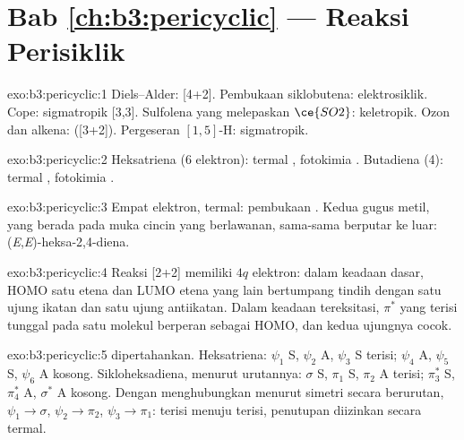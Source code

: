 \section*{Bab \ref{ch:b3:pericyclic} --- Reaksi Perisiklik}

\begin{solution}{exo:b3:pericyclic:1}
Diels--Alder:  [4+2]. Pembukaan siklobutena: elektrosiklik. Cope: sigmatropik
[3,3]. Sulfolena yang melepaskan $\ce{SO2}$: keletropik. Ozon dan alkena: 
([3+2]). Pergeseran $[1,5]$-H: sigmatropik.
\end{solution}

\begin{solution}{exo:b3:pericyclic:2}
Heksatriena (6 elektron): termal , fotokimia .
Butadiena (4): termal , fotokimia .
\end{solution}

\begin{solution}{exo:b3:pericyclic:3}
Empat elektron, termal: pembukaan . Kedua gugus metil, yang berada pada muka
cincin yang berlawanan, sama-sama berputar ke luar: (\textit{E},\textit{E})-heksa-2,4-diena.
\end{solution}

\begin{solution}{exo:b3:pericyclic:4}
Reaksi [2+2]  memiliki $4q$ elektron: dalam keadaan dasar, HOMO satu
etena dan LUMO etena yang lain bertumpang tindih dengan satu ujung ikatan dan satu ujung antiikatan.
Dalam keadaan tereksitasi, $\pi^*$ yang terisi tunggal pada satu molekul berperan sebagai
HOMO, dan kedua ujungnya cocok.
\end{solution}

\begin{solution}{exo:b3:pericyclic:5}
 dipertahankan. Heksatriena: $\psi_1$ S, $\psi_2$ A, $\psi_3$ S terisi; $\psi_4$ A, $\psi_5$ S, $\psi_6$ A kosong.
Sikloheksadiena, menurut urutannya: $\sigma$ S, $\pi_1$ S, $\pi_2$ A terisi; $\pi_3^*$ S, $\pi_4^*$ A, $\sigma^*$ A kosong. Dengan menghubungkan menurut
simetri secara berurutan, $\psi_1 \to \sigma$, $\psi_2 \to \pi_2$, $\psi_3 \to \pi_1$: terisi menuju terisi, penutupan 
diizinkan secara termal.
\end{solution}

